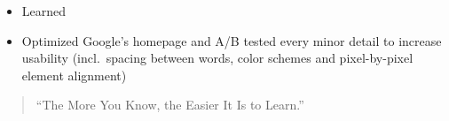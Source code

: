 \documentclass[10pt,a4paper,ragged2e,withhyper]{altacv}
\begin{document}
\begin{paracol}{2}
   \begin{itemize}
      \item Learned
      \item Optimized Google's homepage and A/B tested every minor detail to increase usability (incl.~spacing between words, color schemes and pixel-by-pixel element alignment)
   \end{itemize}






   \switchcolumn
   \begin{quote}
      ``The More You Know, the Easier It Is to Learn.''
   \end{quote}




\end{paracol}
\end{document}

